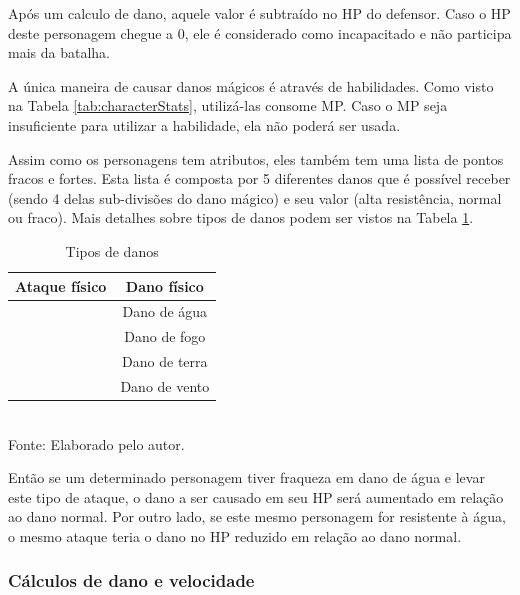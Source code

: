\documentclass[12pt,a4paper]{article}
\newcommand{\source}[1]{\small Fonte: {#1}}
\begin{document}
	Após um calculo de dano,
	aquele valor é subtraído no HP do defensor.
	Caso o HP deste personagem chegue a 0,
	ele é considerado como incapacitado e não participa mais da batalha.
	
	A única maneira de causar danos mágicos é através de habilidades.
	Como visto na Tabela \ref{tab:characterStats},
	utilizá-las consome MP.
	Caso o MP seja insuficiente para utilizar a habilidade,
	ela não poderá ser usada.
	
	Assim como os personagens tem atributos,
	eles também tem uma lista de pontos fracos e fortes.
	Esta lista é composta por 5 diferentes danos que é possível receber
	(sendo 4 delas sub-divisões do dano mágico)
	e seu valor (alta resistência, normal ou fraco).
	Mais detalhes sobre tipos de danos podem ser vistos na Tabela \ref{tab:damageTypes}.
	
	\begin{table}[h]
		\caption{Tipos de danos}
		\centering
		\small
		\renewcommand{\arraystretch}{1.2} %
		\begin{tabular}{>{\centering\arraybackslash}c|c}
			\hline 
			Ataque físico & Dano físico \\ 
			\hline 
			\multirow{4}{*}{Ataque mágico (elemental)}	& Dano de água \\\cline{2-2}
														& Dano de fogo \\\cline{2-2}
														& Dano de terra \\\cline{2-2}
														& Dano de vento \\
			\hline 
		\end{tabular}\\
		\vspace{3mm}
		\source{Elaborado pelo autor.}
		\label{tab:damageTypes}
	\end{table}
	
	Então se um determinado personagem tiver fraqueza em dano de água e levar este tipo de ataque,
	o dano a ser causado em seu HP será aumentado em relação ao dano normal.
	Por outro lado, se este mesmo personagem for resistente à água,
	o mesmo ataque teria o dano no HP reduzido em relação ao dano normal.
	
	\subsubsection{Cálculos de dano e velocidade}
	
\end{document}
